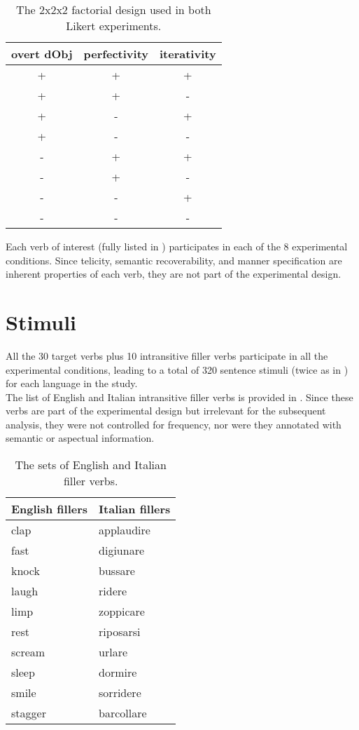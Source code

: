 \begin{table}[htb] %
\caption{The 2x2x2 factorial design used in both Likert experiments.}
\begin{tabular}{ccc}
overt dObj & perfectivity & iterativity \\
\hline
+          & +            & +           \\
+          & +            & -           \\
+          & -            & +           \\
+          & -            & -           \\
-          & +            & +           \\
-          & +            & -           \\
-          & -            & +           \\
-          & -            & -          
\end{tabular}
\end{table}

Each verb of interest (fully listed in ) participates in each of the 8 experimental conditions. Since telicity, semantic recoverability, and manner specification are inherent properties of each verb, they are not part of the experimental design.

\section{Stimuli} 

All the 30 target verbs plus 10 intransitive filler verbs participate in all the experimental conditions, leading to a total of 320 sentence stimuli (twice as in \textcite{Medina2007}) for each language in the study.\\
The list of English and Italian intransitive filler verbs is provided in . Since these verbs are part of the experimental design but irrelevant for the subsequent analysis, they were not controlled for frequency, nor were they annotated with semantic or aspectual information.

\begin{table}[htb] %
\caption{The sets of English and Italian filler verbs.}
\begin{tabular}{ll}
English fillers & Italian fillers \\
\hline
clap	&	applaudire	\\
fast	&	digiunare	\\
knock	&	bussare	\\
laugh	&	ridere	\\
limp	&	zoppicare	\\
rest	&	riposarsi\\
scream	&	urlare	\\
sleep	&	dormire	\\
smile	&	sorridere	\\
stagger	&	barcollare       
\end{tabular}
\end{table}

